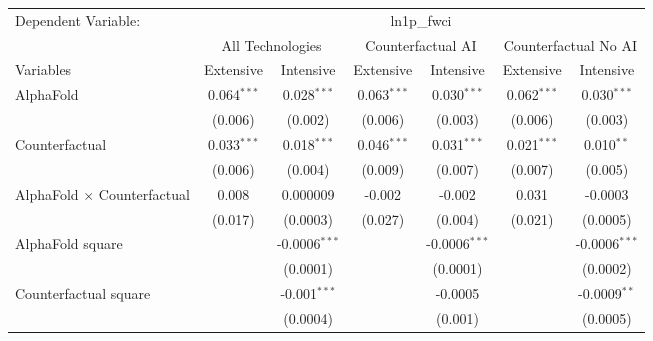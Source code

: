 \begingroup
\centering
\begin{tabular}{lcccccc}
   \tabularnewline \midrule \midrule
   Dependent Variable: & \multicolumn{6}{c}{ln1p\_fwci}\\
 & \multicolumn{2}{c}{All Technologies} & \multicolumn{2}{c}{Counterfactual AI} & \multicolumn{2}{c}{Counterfactual No AI} \\
\cmidrule(lr){1-1}\cmidrule(lr){2-3} \cmidrule(lr){4-5} \cmidrule(lr){6-7}
Variables & \multicolumn{1}{c}{Extensive} & \multicolumn{1}{c}{Intensive} & \multicolumn{1}{c}{Extensive} & \multicolumn{1}{c}{Intensive} & \multicolumn{1}{c}{Extensive} & \multicolumn{1}{c}{Intensive} \\
\cmidrule(lr){1-1}\cmidrule(lr){2-2} \cmidrule(lr){3-3} \cmidrule(lr){4-4} \cmidrule(lr){5-5} \cmidrule(lr){6-6} \cmidrule(lr){7-7}
   AlphaFold                          & 0.064$^{***}$ & 0.028$^{***}$     & 0.063$^{***}$ & 0.030$^{***}$   & 0.062$^{***}$ & 0.030$^{***}$\\   
                                      & (0.006)       & (0.002)           & (0.006)       & (0.003)         & (0.006)       & (0.003)\\   
   Counterfactual                     & 0.033$^{***}$ & 0.018$^{***}$     & 0.046$^{***}$ & 0.031$^{***}$   & 0.021$^{***}$ & 0.010$^{**}$\\   
                                      & (0.006)       & (0.004)           & (0.009)       & (0.007)         & (0.007)       & (0.005)\\   
   AlphaFold $\times$ Counterfactual  & 0.008         & 0.000009          & -0.002        & -0.002          & 0.031         & -0.0003\\   
                                      & (0.017)       & (0.0003)          & (0.027)       & (0.004)         & (0.021)       & (0.0005)\\   
   AlphaFold square                   &               & -0.0006$^{***}$   &               & -0.0006$^{***}$ &               & -0.0006$^{***}$\\   
                                      &               & (0.0001)          &               & (0.0001)        &               & (0.0002)\\   
   Counterfactual square              &               & -0.001$^{***}$    &               & -0.0005         &               & -0.0009$^{**}$\\   
                                      &               & (0.0004)          &               & (0.001)         &               & (0.0005)\\   

\end{tabular}
